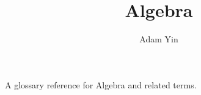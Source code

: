 \documentclass[a4paper]{article}
\title{Algebra}
\author{Adam Yin}
\date{}
\begin{document}
\maketitle
A glossary reference for Algebra and related terms.
\cite{ctforcpsc}
\cite{general_topology}

\clearpage

\glsaddall
{}
\printglossaries

\medskip



\end{document}
